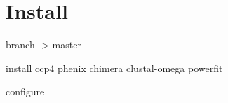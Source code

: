 \section{Install}
  branch -> master
  
  install
  ccp4
  phenix
  chimera
  clustal-omega
  powerfit
  
  configure
